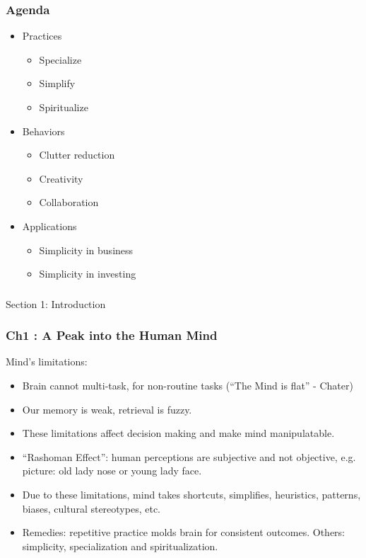 

\begin{frame}[fragile]\frametitle{Agenda}

\begin{itemize}
\item Practices
	\begin{itemize}
	\item Specialize
	\item Simplify
	\item Spiritualize
	\end{itemize}

\item Behaviors
	\begin{itemize}
	\item Clutter reduction
	\item Creativity
	\item Collaboration
	\end{itemize}
	
\item Applications
	\begin{itemize}
	\item Simplicity in business
	\item Simplicity in investing
	\end{itemize}	
\end{itemize}

\end{frame}

\begin{frame}[fragile]\frametitle{}
\begin{center}
{\Large Section 1: Introduction}

\end{center}
\end{frame}

\begin{frame}[fragile]\frametitle{Ch1 : A Peak into the Human Mind}
Mind's limitations:
\begin{itemize}
\item Brain cannot multi-task, for non-routine tasks (``The Mind is flat'' - Chater)
\item Our memory is weak, retrieval is fuzzy.
\item These limitations affect decision making and make mind manipulatable.
\item ``Rashoman Effect'': human perceptions are subjective and not objective, e.g. picture: old lady nose or young lady face.
\item Due to these limitations, mind takes shortcuts, simplifies, heuristics, patterns, biases, cultural stereotypes, etc.
\item Remedies: repetitive practice molds brain for consistent outcomes. Others: simplicity, specialization and spiritualization.
\end{itemize}

\end{frame}

